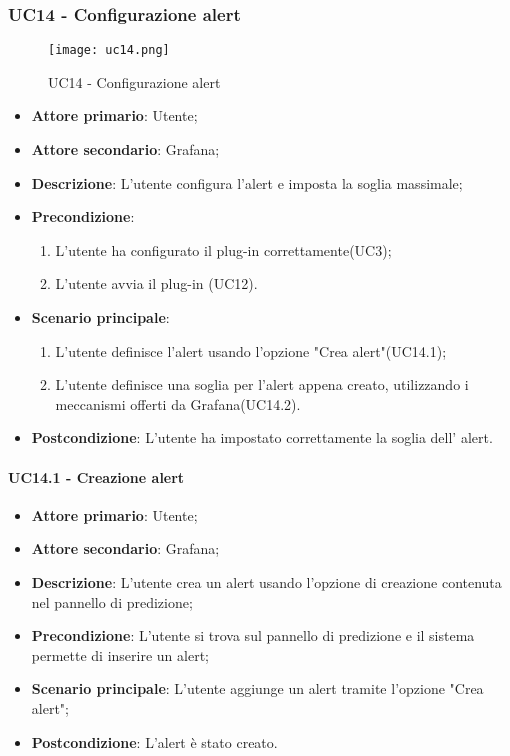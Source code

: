 \subsubsection{UC14 - Configurazione alert}
\label{sssec:uc14}

\begin{figure}[h!]
  \begin{center}
    \texttt{[image: uc14.png]}\\
    \caption{UC14 - Configurazione alert}%
    \label{fig:uc14}
  \end{center}
  \end{figure}

\begin{itemize}
  \item \textbf{Attore primario}: Utente;
  \item \textbf{Attore secondario}: Grafana;
  \item \textbf{Descrizione}: L'utente configura l'alert e imposta la soglia massimale;
  \item \textbf{Precondizione}:
  \begin{enumerate}
		\item L'utente ha configurato il plug-in correttamente(UC3);
		\item L'utente avvia il plug-in (UC12).
	\end {enumerate}
  \item \textbf{Scenario principale}:
  \begin{enumerate}
    \item L'utente definisce l'alert usando l'opzione "Crea alert"(UC14.1);
    \item L'utente definisce una soglia per l'alert appena creato, utilizzando i meccanismi offerti da Grafana(UC14.2).
  \end{enumerate}
  \item \textbf{Postcondizione}: L'utente ha impostato correttamente la soglia dell' alert.
\end{itemize}


\paragraph{UC14.1 - Creazione alert}
\label{para:uc14.1}
\begin{itemize}
  \item \textbf{Attore primario}: Utente;
  \item \textbf{Attore secondario}: Grafana;
  \item \textbf{Descrizione}: L'utente crea un alert usando l'opzione di creazione contenuta nel pannello di predizione;
  \item \textbf{Precondizione}: L'utente si trova sul pannello di predizione e il sistema permette di inserire un alert;
  \item \textbf{Scenario principale}: L'utente aggiunge un alert tramite l'opzione "Crea alert";
  \item \textbf{Postcondizione}: L'alert è stato creato.
\end{itemize}


